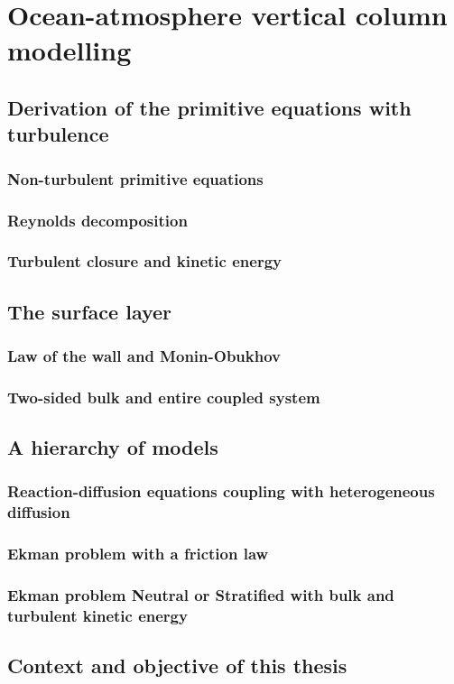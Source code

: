 \chapter{Ocean-atmosphere vertical column modelling}
\label{ch:airseaSCM}
\minitoc
\section{Derivation of the primitive equations with turbulence}
\subsection{Non-turbulent primitive equations}
\subsection{Reynolds decomposition}
\subsection{Turbulent closure and kinetic energy}
\section{The surface layer}
\subsection{Law of the wall and Monin-Obukhov}
\subsection{Two-sided bulk and entire coupled system}
\section{A hierarchy of models}
\subsection{Reaction-diffusion equations coupling
with heterogeneous diffusion}
\subsection{Ekman problem with a friction law}
\label{sec:airseaSCM_hierarchy_Ekman}
\subsection{Ekman problem Neutral or Stratified with bulk and turbulent kinetic energy}
\section{Context and objective of this thesis}
